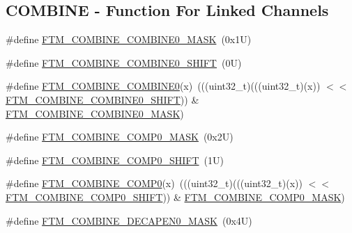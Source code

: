 \subsection*{C\+O\+M\+B\+I\+NE -\/ Function For Linked Channels}
\begin{DoxyCompactItemize}
\item 
\#define \mbox{\hyperlink{group___f_t_m___register___masks_gaf48cb997d418c07e063179fa8459c75a}{F\+T\+M\+\_\+\+C\+O\+M\+B\+I\+N\+E\+\_\+\+C\+O\+M\+B\+I\+N\+E0\+\_\+\+M\+A\+SK}}~(0x1\+U)
\item 
\#define \mbox{\hyperlink{group___f_t_m___register___masks_gabe1e557f9bbddbbe13beac964fa07c1f}{F\+T\+M\+\_\+\+C\+O\+M\+B\+I\+N\+E\+\_\+\+C\+O\+M\+B\+I\+N\+E0\+\_\+\+S\+H\+I\+FT}}~(0\+U)
\item 
\#define \mbox{\hyperlink{group___f_t_m___register___masks_ga8806f5704b5a301aedb626f561421381}{F\+T\+M\+\_\+\+C\+O\+M\+B\+I\+N\+E\+\_\+\+C\+O\+M\+B\+I\+N\+E0}}(x)~(((uint32\+\_\+t)(((uint32\+\_\+t)(x)) $<$$<$ \mbox{\hyperlink{group___f_t_m___register___masks_gabe1e557f9bbddbbe13beac964fa07c1f}{F\+T\+M\+\_\+\+C\+O\+M\+B\+I\+N\+E\+\_\+\+C\+O\+M\+B\+I\+N\+E0\+\_\+\+S\+H\+I\+FT}})) \& \mbox{\hyperlink{group___f_t_m___register___masks_gaf48cb997d418c07e063179fa8459c75a}{F\+T\+M\+\_\+\+C\+O\+M\+B\+I\+N\+E\+\_\+\+C\+O\+M\+B\+I\+N\+E0\+\_\+\+M\+A\+SK}})
\item 
\#define \mbox{\hyperlink{group___f_t_m___register___masks_ga4ac7b3d3c5869c8c8af75bdc506e7c81}{F\+T\+M\+\_\+\+C\+O\+M\+B\+I\+N\+E\+\_\+\+C\+O\+M\+P0\+\_\+\+M\+A\+SK}}~(0x2\+U)
\item 
\#define \mbox{\hyperlink{group___f_t_m___register___masks_ga26f836ae03a05f06608cefafb90082da}{F\+T\+M\+\_\+\+C\+O\+M\+B\+I\+N\+E\+\_\+\+C\+O\+M\+P0\+\_\+\+S\+H\+I\+FT}}~(1\+U)
\item 
\#define \mbox{\hyperlink{group___f_t_m___register___masks_gaa7fb26256978b84ad1abe6b92592ceb7}{F\+T\+M\+\_\+\+C\+O\+M\+B\+I\+N\+E\+\_\+\+C\+O\+M\+P0}}(x)~(((uint32\+\_\+t)(((uint32\+\_\+t)(x)) $<$$<$ \mbox{\hyperlink{group___f_t_m___register___masks_ga26f836ae03a05f06608cefafb90082da}{F\+T\+M\+\_\+\+C\+O\+M\+B\+I\+N\+E\+\_\+\+C\+O\+M\+P0\+\_\+\+S\+H\+I\+FT}})) \& \mbox{\hyperlink{group___f_t_m___register___masks_ga4ac7b3d3c5869c8c8af75bdc506e7c81}{F\+T\+M\+\_\+\+C\+O\+M\+B\+I\+N\+E\+\_\+\+C\+O\+M\+P0\+\_\+\+M\+A\+SK}})
\item 
\#define \mbox{\hyperlink{group___f_t_m___register___masks_ga77c4a4aae8406f791ebfbc82ba85b584}{F\+T\+M\+\_\+\+C\+O\+M\+B\+I\+N\+E\+\_\+\+D\+E\+C\+A\+P\+E\+N0\+\_\+\+M\+A\+SK}}~(0x4\+U)

\end{DoxyCompactItemize}
